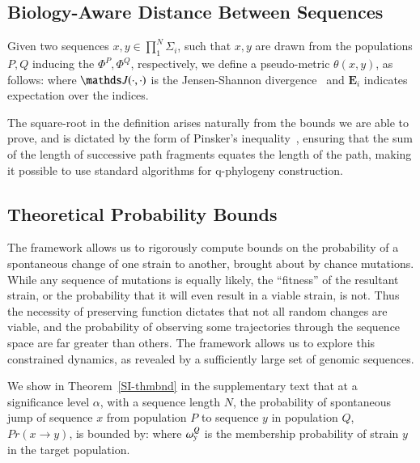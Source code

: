 {\subsection*{Biology-Aware Distance Between Sequences}

\begin{defn}\label{defqdistance}
Given two sequences $x,y \in \prod_1^N\Sigma_i$, such that $x,y$ are drawn from the  populations $P,Q$  inducing the \enet $\Phi^P,\Phi^Q$, respectively,  we define a pseudo-metric $\theta(x,y) $, as follows:
where $ \J(\cdot,\cdot)$ is the Jensen-Shannon divergence~\cite{manning1999foundations} and $\mathbf{E}_i$ indicates expectation over the indices.
\end{defn}
The square-root in the definition arises naturally from the bounds we are able to prove, and is dictated by the form of Pinsker's inequality~\cite{cover}, ensuring that   the sum of the length of successive path fragments equates the length of the path, making it possible to use standard  algorithms  for q-phylogeny construction.





\subsection*{Theoretical Probability Bounds}

The \enet framework  allows us to rigorously compute bounds on the probability of a spontaneous change of one strain to another, brought about by chance mutations. While any sequence of mutations is equally likely, the ``fitness'' of the resultant strain, or the probability that it will even result in a viable strain, is not. Thus the necessity of preserving  function  dictates that not all random changes  are viable, and the probability of observing some trajectories through the sequence space  are far greater  than others. The \enet framework allows us to explore this constrained dynamics, as revealed by a sufficiently large set of genomic sequences.

We show in Theorem~\ref{SI-thmbnd} in the supplementary text that at a significance level $\alpha$, with a sequence length $N$, the probability of spontaneous jump of sequence $x$ from population $P$ to sequence $y$ in population $Q$, $Pr(x \rightarrow y)$, is bounded by:
where $\omega_{y}^Q$ is the membership probability of strain $y$ in the target population.

}
